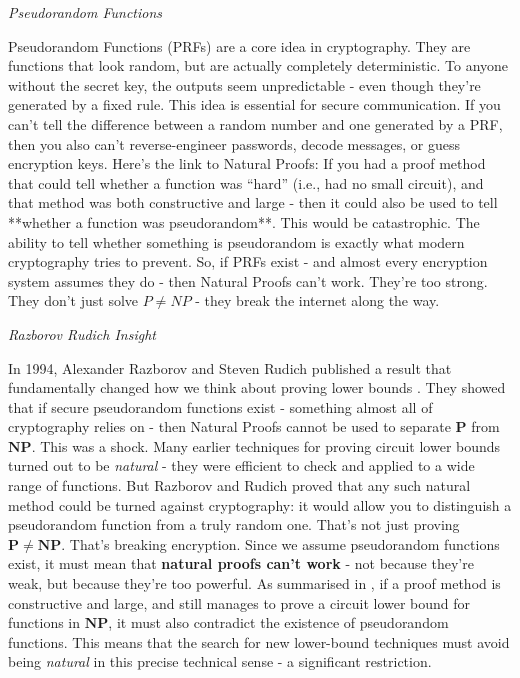 \documentclass[12pt]{report}
\begin{document}
\begin{center}
    \vspace{0cm}
    {\Large\itshape Pseudorandom Functions\par}
\end{center}
Pseudorandom Functions (PRFs) are a core idea in cryptography.  
They are functions that look random, but are actually completely deterministic.  
To anyone without the secret key, the outputs seem unpredictable - even though they're generated by a fixed rule.
This idea is essential for secure communication.  
If you can't tell the difference between a random number and one generated by a PRF, then you also can't reverse-engineer passwords, decode messages, or guess encryption keys.
Here's the link to Natural Proofs:  
If you had a proof method that could tell whether a function was “hard” (i.e., had no small circuit), and that method was both constructive and large - then it could also be used to tell **whether a function was pseudorandom**.
This would be catastrophic. 
The ability to tell whether something is pseudorandom is exactly what modern cryptography tries to prevent.
So, if PRFs exist - and almost every encryption system assumes they do - then Natural Proofs can't work.  
They're too strong.  
They don't just solve $P \neq NP$ - they break the internet along the way.

\begin{center}
    \vspace{0cm}
    {\Large\itshape Razborov Rudich Insight\par}
\end{center}
In 1994, Alexander Razborov and Steven Rudich published a result that fundamentally changed how we think about proving lower bounds \cite{razborov1994}.
They showed that if secure pseudorandom functions exist - something almost all of cryptography relies on - then Natural Proofs cannot be used to separate $\mathbf{P}$ from $\mathbf{NP}$.
This was a shock.
Many earlier techniques for proving circuit lower bounds turned out to be \textit{natural} - they were efficient to check and applied to a wide range of functions.  
But Razborov and Rudich proved that any such natural method could be turned against cryptography: it would allow you to distinguish a pseudorandom function from a truly random one.
That's not just proving $\mathbf{P \ne NP}$.
That's breaking encryption.  
Since we assume pseudorandom functions exist, it must mean that \textbf{natural proofs can't work} - not because they're weak, but because they're too powerful.
As summarised in \cite{arora2009}, if a proof method is constructive and large, and still manages to prove a circuit lower bound for functions in $\mathbf{NP}$, it must also contradict the existence of pseudorandom functions.
This means that the search for new lower-bound techniques must avoid being \textit{natural} in this precise technical sense - a significant restriction.
\end{document}
